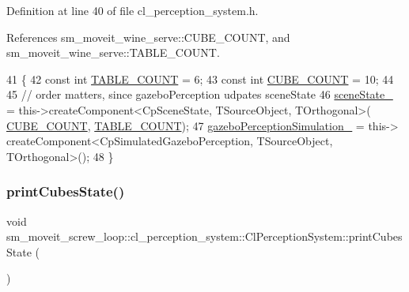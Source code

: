 Definition at line 40 of file cl\+\_\+perception\+\_\+system.\+h.



References sm\+\_\+moveit\+\_\+wine\+\_\+serve\+::\+C\+U\+B\+E\+\_\+\+C\+O\+U\+NT, and sm\+\_\+moveit\+\_\+wine\+\_\+serve\+::\+T\+A\+B\+L\+E\+\_\+\+C\+O\+U\+NT.


\begin{DoxyCode}
41             \{
42                 \textcolor{keyword}{const} \textcolor{keywordtype}{int} \hyperlink{namespacesm__moveit__wine__serve_adaca9c235c0d76019ef6ff08dd32977c}{TABLE\_COUNT} = 6;
43                 \textcolor{keyword}{const} \textcolor{keywordtype}{int} \hyperlink{namespacesm__moveit__wine__serve_ac6a021cad03473894d9b5adfd589f49b}{CUBE\_COUNT} = 10;
44 
45                 \textcolor{comment}{// order matters, since gazeboPerception udpates sceneState}
46                 \hyperlink{classsm__moveit__screw__loop_1_1cl__perception__system_1_1ClPerceptionSystem_abb08b3cc6d4ec414a608da92133b1f66}{sceneState\_} = this->createComponent<CpSceneState, TSourceObject, TOrthogonal>(
      \hyperlink{namespacesm__moveit__wine__serve_ac6a021cad03473894d9b5adfd589f49b}{CUBE\_COUNT}, \hyperlink{namespacesm__moveit__wine__serve_adaca9c235c0d76019ef6ff08dd32977c}{TABLE\_COUNT});
47                 \hyperlink{classsm__moveit__screw__loop_1_1cl__perception__system_1_1ClPerceptionSystem_a45b844a21cd538d4c8e757bf706e6303}{gazeboPerceptionSimulation\_} = this->
      createComponent<CpSimulatedGazeboPerception, TSourceObject, TOrthogonal>();
48             \}
\end{DoxyCode}
\mbox{\label{classsm__moveit__screw__loop_1_1cl__perception__system_1_1ClPerceptionSystem_ae6355186bed36a732791854be792e200}} 
\subsubsection{\texorpdfstring{print\+Cubes\+State()}{printCubesState()}}
{\footnotesize\ttfamily void sm\+\_\+moveit\+\_\+screw\+\_\+loop\+::cl\+\_\+perception\+\_\+system\+::\+Cl\+Perception\+System\+::print\+Cubes\+State (\begin{DoxyParamCaption}{ }\end{DoxyParamCaption})\hspace{0.3cm}{\ttfamily [inline]}}



